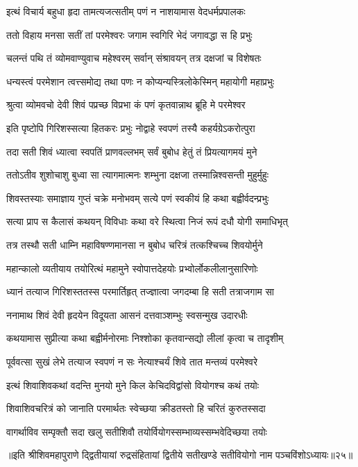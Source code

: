 \twolineshloka
{इत्थं विचार्य बहुधा हृदा तामत्यजत्सतीम्}
{पणं न नाशयामास वेदधर्मप्रपालकः} %

\twolineshloka
{ततो विहाय मनसा सतीं तां परमेश्वरः}
{जगाम स्वगिरि भेदं जगावद्धा स हि प्रभुः} %

\twolineshloka
{चलन्तं पथि तं व्योमवाण्युवाच महेश्वरम्}
{सर्वान् संश्रावयन् तत्र दक्षजां च विशेषतः} %


\twolineshloka
{धन्यस्त्वं परमेशान त्वत्त्समोद्य तथा पणः}
{न कोप्यन्यस्त्रिलोकेस्मिन् महायोगी महाप्रभुः} %


\twolineshloka
{श्रुत्वा व्योमवचो देवी शिवं पप्रच्छ विप्रभा}
{कं पणं कृतवान्नाथ ब्रूहि मे परमेश्वर} %

\twolineshloka
{इति पृष्टोपि गिरिशस्सत्या हितकरः प्रभुः}
{नोद्वाहे स्वपणं तस्यै कहर्यग्रेऽकरोत्पुरा} %

\twolineshloka
{तदा सती शिवं ध्यात्वा स्वपतिं प्राणवल्लभम्}
{सर्वं बुबोध हेतुं तं प्रियत्यागमयं मुने} %

\twolineshloka
{ततोऽतीव शुशोचाशु बुध्वा सा त्यागमात्मनः}
{शम्भुना दक्षजा तस्मान्निश्वसन्ती मुहुर्मुहुः} %

\twolineshloka
{शिवस्तस्याः समाज्ञाय गुप्तं चक्रे मनोभवम्}
{सत्ये पणं स्वकीयं हि कथा बह्वीर्वदन्प्रभुः} %

\twolineshloka
{सत्या प्राप स कैलासं कथयन् विविधाः कथा}
{वरे स्थित्वा निजं रूपं दधौ योगी समाधिभृत्} %

\twolineshloka
{तत्र तस्थौ सती धाम्नि महाविषण्णमानसा}
{न बुबोध चरित्रं तत्कश्चिच्च शिवयोर्मुने} %

\twolineshloka
{महान्कालो व्यतीयाय तयोरित्थं महामुने}
{स्वोपात्तदेहयोः प्रभ्वोर्लोकलीलानुसारिणोः} %

\twolineshloka
{ध्यानं तत्याज गिरिशस्ततस्स परमार्तिहृत्}
{तज्ज्ञात्वा जगदम्बा हि सती तत्राजगाम सा} %

\twolineshloka
{ननामाथ शिवं देवी हृदयेन विदूयता}
{आसनं दत्तवाञ्शम्भुः स्वसन्मुख उदारधीः} %

\twolineshloka
{कथयामास सुप्रीत्या कथा बह्वीर्मनोरमाः}
{निश्शोका कृतवान्सद्यो लीलां कृत्वा च तादृशीम्} %

\twolineshloka
{पूर्ववत्सा सुखं लेभे तत्याज स्वपणं न सः}
{नेत्याश्चर्यं शिवे तात मन्तव्यं परमेश्वरे} %

\twolineshloka
{इत्थं शिवाशिवकथां वदन्ति मुनयो मुने}
{किल केचिदविद्वांसो वियोगश्च कथं तयोः} %

\twolineshloka
{शिवाशिवचरित्रं को जानाति परमार्थतः}
{स्वेच्छया क्रीडतस्तो हि चरितं कुरुतस्सदा} %

\twolineshloka
{वागर्थाविव सम्पृक्तौ सदा खलु सतीशिवौ}
{तयोर्वियोगस्सम्भाव्यस्सम्भवेदिच्छया तयोः} %

॥इति श्रीशिवमहापुराणे द्द्वितीयायां रुद्रसंहितायां द्वितीये सतीखण्डे सतीवियोगो नाम पञ्चविंशोऽध्यायः॥२५॥

\closesection